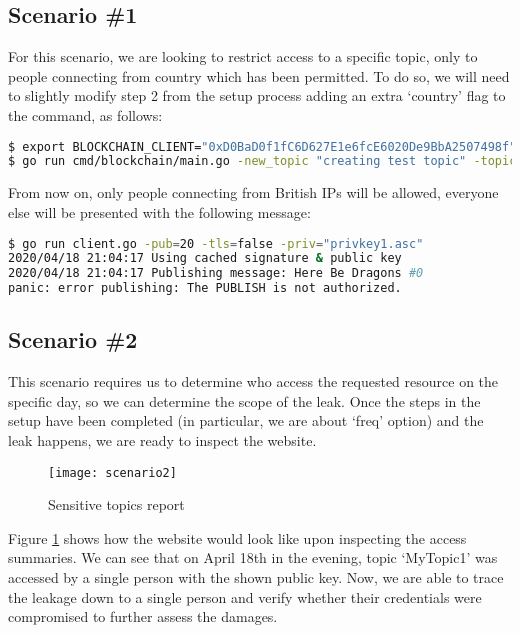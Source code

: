 \subsection{Scenario \#1}
For this scenario, we are looking to restrict access to a specific topic, only to people connecting from country which has been permitted. To do so, we will need to slightly modify step 2 from the setup process adding an extra `country' flag to the command, as follows:
\begin{lstlisting}[language=bash,breaklines=true]
$ export BLOCKCHAIN_CLIENT="0xD0BaD0f1fC6D627E1e6fcE6020De9BbA2507498f"
$ go run cmd/blockchain/main.go -new_topic "creating test topic" -topic "RestrictedTopic" -country="GB"
\end{lstlisting}
From now on, only people connecting from British IPs will be allowed, everyone else will be presented with the following message:
\begin{lstlisting}[language=bash,breaklines=true]
$ go run client.go -pub=20 -tls=false -priv="privkey1.asc"
2020/04/18 21:04:17 Using cached signature & public key
2020/04/18 21:04:17 Publishing message: Here Be Dragons #0
panic: error publishing: The PUBLISH is not authorized.
\end{lstlisting}
\subsection{Scenario \#2}
This scenario requires us to determine who access the requested resource on the specific day, so we can determine the scope of the leak. Once the steps in the setup have been completed (in particular, we are about `freq' option) and the leak happens, we are ready to inspect the website.

\begin{figure}[h]
    \centering
    \texttt{[image: scenario2]}
    \caption{Sensitive topics report}
    \label{fig:scenario2}
\end{figure}
Figure \ref{fig:scenario2} shows how the website would look like upon inspecting the access summaries. We can see that on April 18th in the evening, topic `MyTopic1' was accessed by a single person with the shown public key. Now, we are able to trace the leakage down to a single person and verify whether their credentials were compromised to further assess the damages.
